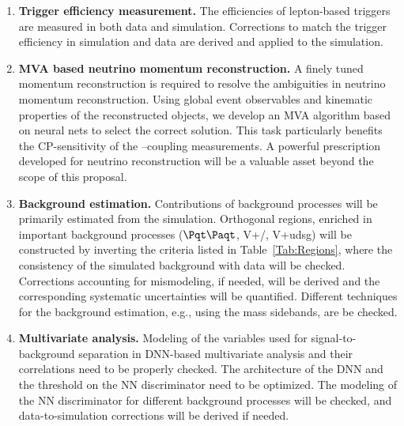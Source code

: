 \documentclass[a4paper,11pt]{article}
\newcommand{\Pb}{{{\Pqb}}\xspace}
\newcommand{\Pt}{{{\Pqt}}\xspace}
\newcommand{\Pc}{{{\Pqc}}\xspace}
\newcommand{\PAt}{{{{\Paqt}}}\xspace}
\renewcommand{\PV}{{{{V}}}\xspace}
\begin{document}
\begin{enumerate}[noitemsep,topsep=0pt]
\item {\bf Trigger efficiency measurement.} The efficiencies of lepton-based triggers are measured in both data and simulation. 
Corrections to match the trigger efficiency in simulation and data are derived and applied to the simulation. 

\item {\bf MVA based neutrino momentum reconstruction.}
A finely tuned momentum reconstruction is required to resolve the ambiguities in neutrino momentum reconstruction. Using global event observables and kinematic properties of the reconstructed objects, we develop an MVA algorithm based on neural nets to select the correct solution. This task particularly benefits the CP-sensitivity of the \PH--\PW coupling measurements. 
A powerful prescription developed for neutrino reconstruction 
will be a valuable asset beyond the scope of this proposal.

\item {\bf Background estimation.} 
Contributions of background processes will be primarily estimated from the simulation. Orthogonal regions, enriched in important background processes ($\Pt\PAt$, {\PV}+\Pb/\Pc, {\PV}+udsg) will be constructed by inverting the criteria listed in Table~\ref{Tab:Regions}, where the consistency of the simulated background with data will be checked. 
Corrections accounting for mismodeling, if needed, will be derived and the corresponding systematic uncertainties will be quantified. 
Different techniques for the background estimation, e.g., using the mass sidebands, are be checked. 

\item {\bf Multivariate analysis.} Modeling of the variables used for signal-to-background separation in DNN-based multivariate analysis and their correlations need to be properly checked. 
The architecture of the DNN and the threshold on the NN discriminator need to be optimized. 
The modeling of the NN discriminator for different background processes will be checked, 
and data-to-simulation corrections will be derived if needed. 


\end{enumerate}
\end{document}
